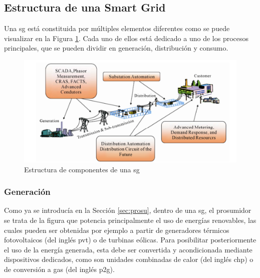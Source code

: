 \subsection{Estructura de una Smart Grid}

Una \gls{sg} está constituida por múltiples elementos diferentes como se puede visualizar en la Figura \ref{fig:estructura_sg}. Cada uno de ellos está dedicado a uno de los procesos principales, que se pueden dividir en generación, distribución y consumo. \cite{smartgrid_overview}

\vspace{3mm}

\begin{figure}[h]
  \centering
  \includegraphics[width=1\textwidth]{img/teoria/estructura_sg.png}
  \caption{Estructura de componentes de una \gls{sg} \cite{smartgrid_overview}}
  \label{fig:estructura_sg}
\end{figure}

\subsubsection{Generación}

Como ya se introducía en la Sección \ref{sec:prosu}, dentro de una \gls{sg}, el prosumidor se trata de la figura que potencia principalmente el uso de energías renovables, las cuales pueden ser obtenidas por ejemplo a partir de generadores térmicos fotovoltaicos (del inglés \gls{pvt}) o de turbinas eólicas. Para posibilitar posteriormente el uso de la energía generada, esta debe ser convertida y acondicionada mediante dispositivos dedicados, como son unidades combinadas de calor (del inglés \gls{chp}) o de conversión a gas (del inglés \gls{p2g}). \cite{transactive}

\vspace{3mm}

